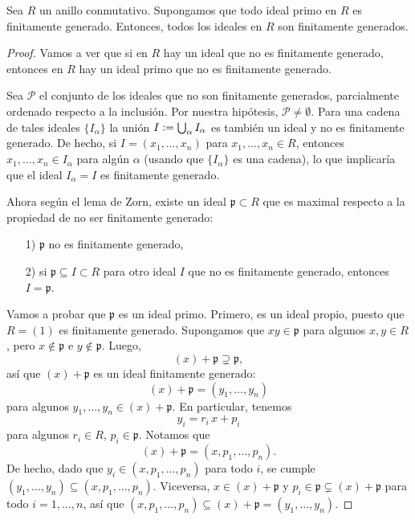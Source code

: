 \begin{teorema}[I.S. Cohen]
  Sea $R$ un anillo conmutativo. Supongamos que todo ideal primo en $R$
  es finitamente generado. Entonces, todos los ideales en $R$ son finitamente
  generados.

  \begin{proof}
    Vamos a ver que si en $R$ hay un ideal que no es finitamente generado,
    entonces en $R$ hay un ideal primo que no es finitamente generado.

    Sea $\mathcal{P}$ el conjunto de los ideales que no son finitamente
    generados, parcialmente ordenado respecto a la inclusión. Por nuestra
    hipótesis, $\mathcal{P} \ne \emptyset$. Para una cadena de tales ideales
    $\{ I_\alpha \}$ la unión $I \mathrel{\mathop:}= \bigcup_\alpha I_\alpha$ es también un
    ideal y no es finitamente generado. De hecho, si $I = (x_1,\ldots,x_n)$ para
    $x_1, \ldots, x_n \in R$, entonces $x_1,\ldots,x_n \in I_\alpha$ para algún
    $\alpha$ (usando que $\{ I_\alpha \}$ es una cadena), lo que implicaría que
    el ideal $I_\alpha = I$ es finitamente generado.

    Ahora según el lema de Zorn, existe un ideal $\mathfrak{p} \subset R$ que
    es maximal respecto a la propiedad de no ser finitamente generado:

    \begin{enumerate}
    \item[1)] $\mathfrak{p}$ no es finitamente generado,

    \item[2)] si $\mathfrak{p} \subseteq I \subset R$ para otro ideal $I$ que
      no es finitamente generado, entonces $I = \mathfrak{p}$.
    \end{enumerate}

    Vamos a probar que $\mathfrak{p}$ es un ideal primo. Primero, es un ideal
    propio, puesto que $R = (1)$ es finitamente generado. Supongamos que
    $xy \in \mathfrak{p}$ para algunos $x,y\in R$, pero $x\notin \mathfrak{p}$ e
    $y\notin \mathfrak{p}$. Luego,
    $$(x) + \mathfrak{p} \supsetneq \mathfrak{p},$$
    así que $(x) + \mathfrak{p}$ es un ideal finitamente generado:
    $$(x) + \mathfrak{p} = (y_1,\ldots,y_n)$$
    para algunos $y_1,\ldots,y_n \in (x) + \mathfrak{p}$. En particular, tenemos
    $$y_i = r_i\,x + p_i$$
    para algunos $r_i\in R$, $p_i \in \mathfrak{p}$. Notamos que
    $$(x) + \mathfrak{p} = (x,p_1,\ldots,p_n).$$
    De hecho, dado que $y_i \in (x,p_1,\ldots,p_n)$ para todo $i$, se cumple
    $(y_1,\ldots,y_n) \subseteq (x,p_1,\ldots,p_n)$. Viceversa,
    $x \in (x) + \mathfrak{p}$ y
    $p_i \in \mathfrak{p} \subsetneq (x) + \mathfrak{p}$ para todo
    $i = 1,\ldots,n$, así que
    $(x,p_1,\ldots,p_n) \subseteq (x) + \mathfrak{p} = (y_1,\ldots,y_n)$.


\end{proof}
\end{teorema}
